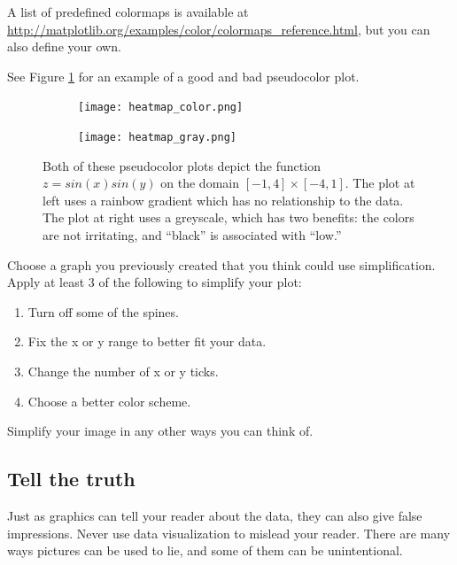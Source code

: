 A list of predefined colormaps is available at \url{http://matplotlib.org/examples/color/colormaps_reference.html}, but you can also define your own. 

See Figure \ref{fig:heatmap} for an example of a good and bad pseudocolor plot.



\begin{figure}
\centering
\begin{subfigure}{.5\textwidth}
  \centering
  \texttt{[image: heatmap\_color.png]}
\end{subfigure}%
\begin{subfigure}{.5\textwidth}
  \centering
  \texttt{[image: heatmap\_gray.png]}
\end{subfigure}
\caption{Both of these pseudocolor plots depict the function $z = sin(x)sin(y)$ on the domain $[-1,4] \times [-4,1]$. 
The plot at left uses a rainbow gradient which has no relationship to the data. 
The plot at right uses a greyscale, which has two benefits: the colors are not irritating, and ``black'' is associated with ``low.''}
\label{fig:heatmap}
\end{figure}


\begin{problem}
Choose a graph you previously created that you think could use simplification. 
Apply at least 3 of the following to simplify your plot:
\begin{enumerate}
\item Turn off some of the spines.
\item Fix the x or y range to better fit your data.
\item Change the number of x or y ticks.
\item Choose a better color scheme.
\end{enumerate}
Simplify your image in any other ways you can think of.
\end{problem}

\subsection*{Tell the truth}

Just as graphics can tell your reader about the data, they can also give false impressions. 
Never use data visualization to mislead your reader. 
There are many ways pictures can be used to lie, and some of them can be unintentional.

